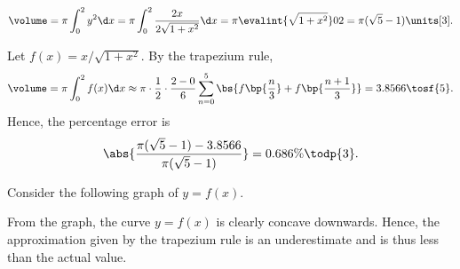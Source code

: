 \begin{solution}
    \begin{ppart}
        \[\volume = \pi \int_0^2 y^2 \d x = \pi \int_0^2 \frac{2x}{2\sqrt{1 + x^2}} \d x = \pi \evalint{\sqrt{1 + x^2}}02 = \pi(\sqrt5 - 1) \units[3].\]
    \end{ppart}
    \begin{ppart}
        Let $f(x) = x/\sqrt{1 + x^2}$. By the trapezium rule, \[\volume = \pi \int_0^2 f(x) \d x \approx \pi \cdot \frac12 \cdot \frac{2-0}{6} \sum_{n=0}^5 \bs{f\bp{\frac{n}3} + f\bp{\frac{n+1}3}} = 3.8566 \tosf{5}.\] Hence, the percentage error is \[\abs{\frac{\pi(\sqrt5 - 1) - 3.8566}{\pi(\sqrt5 - 1)}} = 0.686\% \todp{3}.\]

        Consider the following graph of $y = f(x)$.

        \begin{center}
        \end{center}
        
        From the graph, the curve $y = f(x)$ is clearly concave downwards. Hence, the approximation given by the trapezium rule is an underestimate and is thus less than the actual value.
    \end{ppart}
\end{solution}

